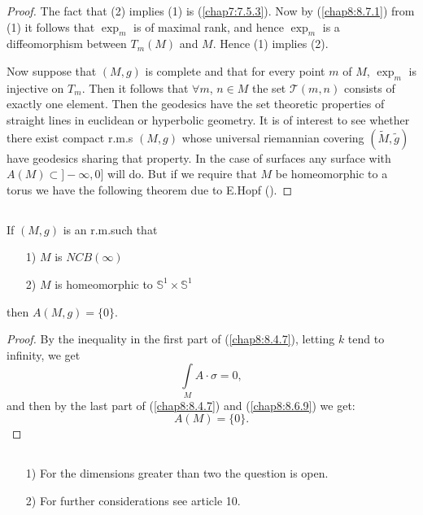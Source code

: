 \begin{proof}
The fact that (2) implies (1) is (\ref{chap7:7.5.3}). Now by
(\ref{chap8:8.7.1}) from (1) it follows that $\exp_{m}$ is of maximal
rank, and hence $\exp_{m}$ is a diffeomorphism between $T_{m}(M)$ and
$M$. Hence (1) implies (2).

Now suppose that $(M,g)$ is complete and that for every point $m$ of
$M$, $\exp_{m}$ is injective on $T_{m}$. Then it follows that $\forall
m$, $n\in M$ the set $\mathscr{T}(m,n)$ consists of exactly one
element. Then the geodesics have the set theoretic properties of
straight lines in euclidean or hyperbolic geometry. It is of interest
to see whether there exist compact r.m.s $(M,g)$ whose universal
riemannian covering $(\widetilde{M},\widetilde{g})$ have geodesics
sharing that property. In the case of surfaces any surface with
$A(M)\subset ]-\infty,0]$ \pageoriginale will do. But if we require
that $M$ be homeomorphic to a torus we have the following theorem due
to E.\@ Hopf (\cite{15}).
\end{proof}


\subsection{}\label{chap8:8.7.3}

\begin{theorem*}
If $(M,g)$ is an r.m.\@ such that
\begin{itemize}
\item[\rm 1)] $M$ is $NCB(\infty)$

\item[\rm 2)] $M$ is homeomorphic to
  $\mathbb{S}^{1}\times\mathbb{S}^{1}$
\end{itemize}
then $A(M,g)=\{0\}$.
\end{theorem*}

\begin{proof}
By the inequality in the first part of (\ref{chap8:8.4.7}), letting $k$
tend to infinity, we get
$$
\int\limits_{M}A\cdot\sigma=0,
$$
and then by the last part of (\ref{chap8:8.4.7}) and (\ref{chap8:8.6.9})
we get:
$$
A(M)=\{0\}.
$$
\end{proof}


\subsection{}\label{chap8:8.7.4}

\begin{remarks*}
\begin{itemize}
\item[1)] For the dimensions greater than two the question is open.

\item[2)] For further considerations see article 10.
\end{itemize}
\end{remarks*}

